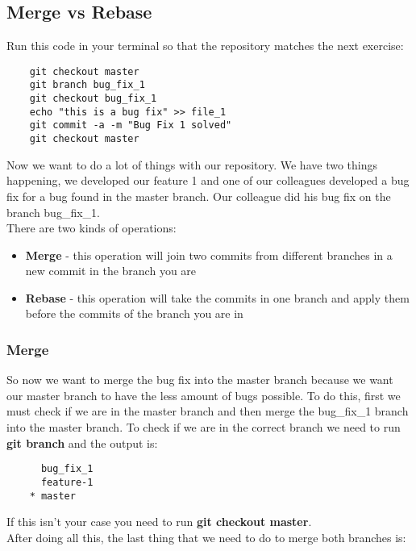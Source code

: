 \documentclass{article}
\begin{document}
\subsection{Merge vs Rebase}

Run this code in your terminal so that the repository matches the next exercise:

\begin{lstlisting}
	git checkout master
	git branch bug_fix_1
	git checkout bug_fix_1
	echo "this is a bug fix" >> file_1
	git commit -a -m "Bug Fix 1 solved"
	git checkout master
\end{lstlisting}

Now we want to do a lot of things with our repository. We have two things happening, we developed our feature 1 and one of our colleagues developed a bug fix for a bug found in the master branch. Our colleague did his bug fix on the branch bug\_fix\_1.\\

There are two kinds of operations: 

\begin{itemize}
	\item{\textbf{Merge} - this operation will join two commits from different branches in a new commit in the branch you are}
	\item{\textbf{Rebase} - this operation will take the commits in one branch and apply them before the commits of the branch you are in}
\end{itemize}

\subsubsection{Merge}

So now we want to merge the bug fix into the master branch because we want our master branch to have the less amount of bugs possible. To do this, first we must check if we are in the master branch and then merge the bug\_fix\_1 branch into the master branch. To check if we are in the correct branch we need to run \textbf{git branch} and the output is:

\begin{lstlisting}
	  bug_fix_1
	  feature-1
	* master
\end{lstlisting}

If this isn't your case you need to run \textbf{git checkout master}.\\

After doing all this, the last thing that we need to do to merge both branches is:
\end{document}
